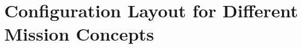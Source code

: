 \chapter{Configuration Layout for Different Mission Concepts}
\label{app:config_layout_different_missions}

